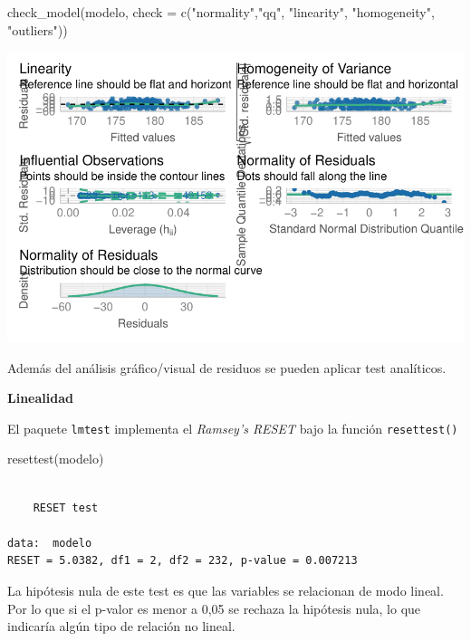 \documentclass[
  letterpaper,
  DIV=11,
  numbers=noendperiod]{scrartcl}
\newenvironment{Shaded}{\begin{snugshade}}{\end{snugshade}}
\newcommand{\AttributeTok}[1]{\textcolor[rgb]{0.40,0.45,0.13}{#1}}
\newcommand{\FunctionTok}[1]{\textcolor[rgb]{0.28,0.35,0.67}{#1}}
\newcommand{\NormalTok}[1]{\textcolor[rgb]{0.00,0.23,0.31}{#1}}
\newcommand{\StringTok}[1]{\textcolor[rgb]{0.13,0.47,0.30}{#1}}
\begin{document}
\begin{Shaded}
\begin{Highlighting}[]
\FunctionTok{check\_model}\NormalTok{(modelo, }\AttributeTok{check =} \FunctionTok{c}\NormalTok{(}\StringTok{"normality"}\NormalTok{,}\StringTok{"qq"}\NormalTok{, }\StringTok{"linearity"}\NormalTok{,}
                              \StringTok{"homogeneity"}\NormalTok{, }\StringTok{"outliers"}\NormalTok{))}
\end{Highlighting}
\end{Shaded}

\begin{center}
\includegraphics{index_files/figure-pdf/unnamed-chunk-32-1.pdf}
\end{center}

Además del análisis gráfico/visual de residuos se pueden aplicar test
analíticos.

\textbf{Linealidad}

El paquete \texttt{lmtest} implementa el \emph{Ramsey's RESET} bajo la
función \texttt{resettest()}

\begin{Shaded}
\begin{Highlighting}[]
\FunctionTok{resettest}\NormalTok{(modelo)}
\end{Highlighting}
\end{Shaded}

\begin{verbatim}

    RESET test

data:  modelo
RESET = 5.0382, df1 = 2, df2 = 232, p-value = 0.007213
\end{verbatim}

La hipótesis nula de este test es que las variables se relacionan de
modo lineal. Por lo que si el p-valor es menor a 0,05 se rechaza la
hipótesis nula, lo que indicaría algún tipo de relación no lineal.
\end{document}
